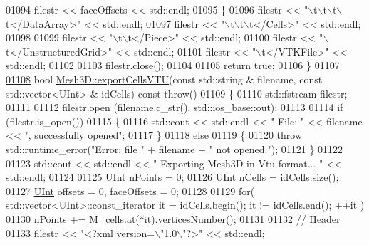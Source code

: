 \begin{DoxyCode}
01094         filestr << faceOffsets << std::endl;
01095     \}
01096     filestr << \textcolor{stringliteral}{"\(\backslash\)t\(\backslash\)t\(\backslash\)t\(\backslash\)t</DataArray>"} << std::endl;
01097     filestr << \textcolor{stringliteral}{"\(\backslash\)t\(\backslash\)t\(\backslash\)t</Cells>"} << std::endl;
01098 
01099     filestr << \textcolor{stringliteral}{"\(\backslash\)t\(\backslash\)t</Piece>"} << std::endl;
01100     filestr << \textcolor{stringliteral}{"\(\backslash\)t</UnstructuredGrid>"} << std::endl;
01101     filestr << \textcolor{stringliteral}{"\(\backslash\)t</VTKFile>"} << std::endl;
01102 
01103     filestr.close();
01104 
01105     \textcolor{keywordflow}{return} \textcolor{keyword}{true};
01106 \}
01107 
\hypertarget{Mesh3D_8cpp_source.tex_l01108}{}\hyperlink{classFVCode3D_1_1Mesh3D_a77553756736b340eb9de044471b73150}{01108} \textcolor{keywordtype}{bool} \hyperlink{classFVCode3D_1_1Mesh3D_a77553756736b340eb9de044471b73150}{Mesh3D::exportCellsVTU}(\textcolor{keyword}{const} std::string & filename, \textcolor{keyword}{const} std::vector<UInt> & 
      idCells) \textcolor{keyword}{const} \textcolor{keywordflow}{throw}()
01109 \{
01110     std::fstream filestr;
01111 
01112     filestr.open (filename.c\_str(), std::ios\_base::out);
01113 
01114     \textcolor{keywordflow}{if} (filestr.is\_open())
01115     \{
01116         std::cout << std::endl << \textcolor{stringliteral}{" File: "} << filename << \textcolor{stringliteral}{", successfully opened"};
01117     \}
01118     \textcolor{keywordflow}{else}
01119     \{
01120         \textcolor{keywordflow}{throw} std::runtime\_error(\textcolor{stringliteral}{"Error: file "} + filename + \textcolor{stringliteral}{" not opened."});
01121     \}
01122 
01123     std::cout << std::endl << \textcolor{stringliteral}{" Exporting Mesh3D in Vtu format... "} << std::endl;
01124 
01125     \hyperlink{namespaceFVCode3D_a4bf7e328c75d0fd504050d040ebe9eda}{UInt} nPoints = 0;
01126     \hyperlink{namespaceFVCode3D_a4bf7e328c75d0fd504050d040ebe9eda}{UInt} nCells = idCells.size();
01127     \hyperlink{namespaceFVCode3D_a4bf7e328c75d0fd504050d040ebe9eda}{UInt} offsets = 0, faceOffsets = 0;
01128 
01129     \textcolor{keywordflow}{for}( std::vector<UInt>::const\_iterator it = idCells.begin(); it != idCells.end(); ++it )
01130         nPoints += \hyperlink{classFVCode3D_1_1Mesh3D_a8cac877e809226fb96078183efb25a2f}{M\_cells}.at(*it).verticesNumber();
01131 
01132     \textcolor{comment}{// Header}
01133     filestr << \textcolor{stringliteral}{"<?xml version=\(\backslash\)"1.0\(\backslash\)"?>"} << std::endl;

\end{DoxyCode}
